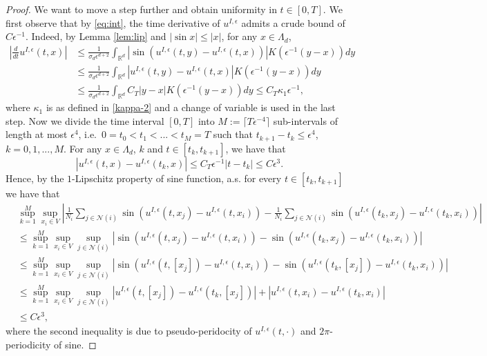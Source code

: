 \documentclass[a4paper,11pt]{amsart}
\newcommand{\red}[1]{{#1}}
\newcommand{\R}{\mathbb{R}}
\newcommand{\ep}{\epsilon}
\newcommand{\cN}{\mathcal{N}}
\newcommand{\blue}[1]{{\color{blue}#1}}{}
\numberwithin{equation}{section}
\numberwithin{theorem}{section}
\theoremstyle{definition}
\begin{document}
\begin{proof}
We want to move a step further and obtain uniformity in $t\in[0,T]$. We first observe that by \eqref{eq:int}, the time derivative of $u^{I,\ep}$ admits a crude bound of $C\ep^{-1}$. Indeed, by Lemma \ref{lem:lip} and $|\sin x|\le |x|$, for any $x\in\Lambda_d$,
\begin{align*}
\left|\displaystyle{\frac{d}{dt}}u^{I,\ep}(t,x)\right| & \le \displaystyle{\frac{1}{\sigma_d\ep^{d+2}}}\int_{\R^d}\left|\sin\left(u^{I,\ep}(t,y)-u^{I,\ep}(t,x)\right)\right|K\left(\ep^{-1}(y-x)\right)dy\\
&\le \displaystyle{\frac{1}{\sigma_d\ep^{d+2}}}\int_{\R^d}\left|u^{I,\ep}(t,y)-u^{I,\ep}(t,x)\right|K\left(\ep^{-1}(y-x)\right)dy\\
&\le  \displaystyle{\frac{1}{\sigma_d\ep^{d+2}}}\int_{\R^d}C_T\left|y-x\right|K\left(\ep^{-1}(y-x)\right)dy\le C_T\kappa_1\ep^{-1},
\end{align*}
where $\kappa_1$ is as defined in \eqref{kappa-2} and a change of variable is used in the last step.
Now we divide the time interval $[0, T]$ into $M:=\lceil T\ep^{-4}\rceil$ sub-intervals of length at most $\ep^4$, i.e.~$0=t_0<t_1<...<t_M=T$ such that $t_{k+1}-t_k\le \ep^4$, $k=0,1,...,M$. For any \red{$x\in\Lambda_d$}, $k$ and $t\in[t_k, t_{k+1}]$, we have that 
\[
|u^{I,\ep}(t,x)-u^{I,\ep}(t_{k},x)|\le C_T\ep^{-1}|t-t_k|\le C\ep^3.
\]
Hence, by the $1$-Lipschitz property of sine function, a.s. for every $t\in[t_k,t_{k+1}]$ we have that %
\begin{align*}
&\sup_{k=1}^M\sup_{x_i\in V}\left|\frac{1}{N_i}\sum_{j\in\cN(i)}\sin\left(u^{I,\ep}(t,x_j)-u^{I,\ep}(t,x_i)\right)-\frac{1}{N_i}\sum_{j\in\cN(i)}\sin\left(u^{I,\ep}(t_{k},x_j)-u^{I,\ep}(t_{k},x_i)\right)\right|\\
&\le \sup_{k=1}^M\sup_{x_i\in V}\sup_{j\in\cN(i)}\left|\sin\left(u^{I,\ep}(t,x_j)-u^{I,\ep}(t,x_i)\right)-\sin\left(u^{I,\ep}(t_k,x_j)-u^{I,\ep}(t_{k},x_i)\right)\right|\\
&\le \red{\sup_{k=1}^M\sup_{x_i\in V}\sup_{j\in\cN(i)}\left|\sin\left(u^{I,\ep}(t,[x_j])-u^{I,\ep}(t,x_i)\right)-\sin\left(u^{I,\ep}(t_k,[x_j])-u^{I,\ep}(t_{k},x_i)\right)\right|}\\
&\le\red{ \sup_{k=1}^M\sup_{x_i\in V}\sup_{j\in\cN(i)}|u^{I,\ep}(t,[x_j])-u^{I,\ep}(t_{k},[x_j])|+
|u^{I,\ep}(t,x_i)-u^{I,\ep}(t_{k},x_i)|}\\
&\le C\ep^3,
\end{align*}
\red{where the second inequality is due to pseudo-peridocity of $u^{I,\ep}(t,\cdot)$ and $2\pi$-periodicity of sine.}

\end{proof}
\end{document}
